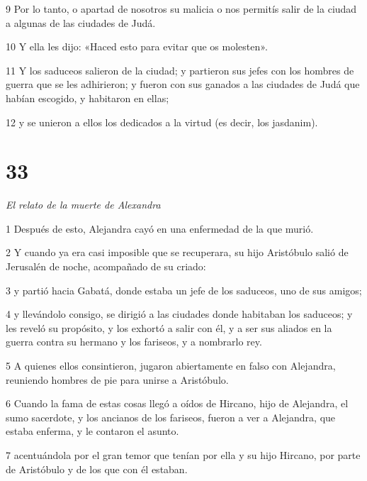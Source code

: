 \par 9 Por lo tanto, o apartad de nosotros su malicia o nos permitís salir de la ciudad a algunas de las ciudades de Judá.

\par 10 Y ella les dijo: «Haced esto para evitar que os molesten».

\par 11 Y los saduceos salieron de la ciudad; y partieron sus jefes con los hombres de guerra que se les adhirieron; y fueron con sus ganados a las ciudades de Judá que habían escogido, y habitaron en ellas;

\par 12 y se unieron a ellos los dedicados a la virtud (es decir, los jasdanim).

\chapter{33}

\par \textit{El relato de la muerte de Alexandra}

\par 1 Después de esto, Alejandra cayó en una enfermedad de la que murió.

\par 2 Y cuando ya era casi imposible que se recuperara, su hijo Aristóbulo salió de Jerusalén de noche, acompañado de su criado:

\par 3 y partió hacia Gabatá, donde estaba un jefe de los saduceos, uno de sus amigos;

\par 4 y llevándolo consigo, se dirigió a las ciudades donde habitaban los saduceos; y les reveló su propósito, y los exhortó a salir con él, y a ser sus aliados en la guerra contra su hermano y los fariseos, y a nombrarlo rey.

\par 5 A quienes ellos consintieron, jugaron abiertamente en falso con Alejandra, reuniendo hombres de pie para unirse a Aristóbulo.

\par 6 Cuando la fama de estas cosas llegó a oídos de Hircano, hijo de Alejandra, el sumo sacerdote, y los ancianos de los fariseos, fueron a ver a Alejandra, que estaba enferma, y ​​le contaron el asunto.

\par 7 acentuándola por el gran temor que tenían por ella y su hijo Hircano, por parte de Aristóbulo y de los que con él estaban.

